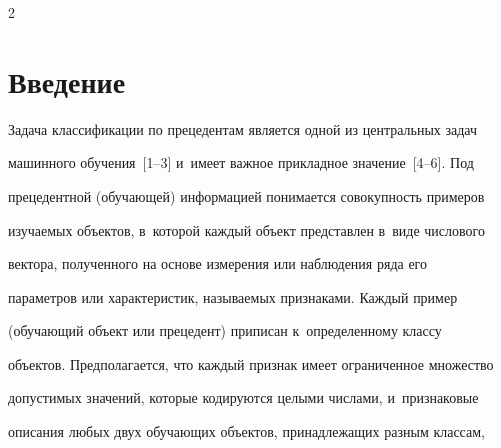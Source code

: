 

  


\vspace*{-2pt}













\thispagestyle{headings}





\begin{multicols}{2}





\label{st\stat}








\section{Введение}





\vspace*{-3pt}





  Задача классификации по прецедентам является одной из центральных задач 


машинного обуче\-ния~[1--3] и~имеет важ\-ное прикладное значение~[4--6]. Под 


прецедентной (обуча\-ющей) \mbox{информацией} понимается совокупность примеров 


изуча\-емых объектов, в~которой каждый объект представлен в~виде числового 


вектора, полученного на основе измерения или наблюдения ряда его 


па\-ра\-мет\-ров или характеристик, называемых признаками. Каждый пример 


(обучающий объект или прецедент) приписан к~определенному классу 


объектов. Предполагается, что каждый признак имеет ограниченное множество 


допустимых значений, которые кодируются целыми числами, и~признаковые 


описания любых двух обучающих объектов, принадлежащих разным классам, 



\end{multicols}
